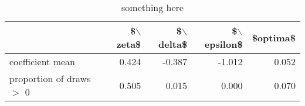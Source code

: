 \begin{table}[ht]
\centering
\begin{tabular}{lrrrr}
  \hline
  & \$$\backslash$zeta\$ & \$$\backslash$delta\$ & \$$\backslash$epsilon\$ & \$optima\$ \\ 
  \hline
coefficient mean & 0.424 & -0.387 & -1.012 & 0.052 \\ 
  proportion of draws $>$ 0 & 0.505 & 0.015 & 0.000 & 0.070 \\ 
   \hline
\end{tabular}
\caption{something here} 
\end{table}
